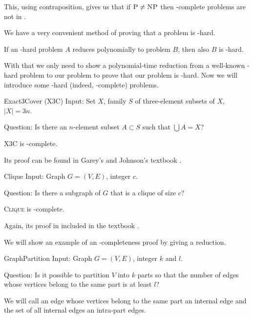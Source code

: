 This, using contraposition, gives us that if $\text{\textsc{P}} \neq \text{\textsc{NP}}$ then \np-complete problems are not in \p.

We have a very convenient method of proving that a problem is \np-hard.

\begin{rmrk}
If an \np-hard problem $A$ reduces polynomially to problem $B$, then also $B$ is \np-hard.
\end{rmrk}

With that we only need to show a polynomial-time reduction from a well-known \np-hard problem
to our problem to prove that our problem is \np-hard.
Now we will introduce some \np-hard (indeed, \np-complete) problems.

\begin{problem}{Exact3Cover (X3C)}
	Input: Set $X$, family $S$ of three-element subsets of $X$, $\vert{X}\vert = 3n$.

	Question: Is there an $n$-element subset $A \subset S$ such that $\bigcup A = X$?
\end{problem}

\begin{thm}
\textsc{X3C} is \np-complete.
\end{thm}

Its proof can be found in Garey's and Johnson's textbook \cite{computersandintractability}.

\begin{problem}{Clique}
    Input: Graph $G = (V, E)$, integer $c$.

    Question: Is there a subgraph of $G$ that is a clique of size $c$?
\end{problem}

\begin{thm}
\textsc{Clique} is \np-complete.
\end{thm}

Again, its proof in included in the textbook \cite{computersandintractability}.


We will show an example of an \np-completeness proof by giving a reduction.

\begin{problem}{GraphPartition}
Input: Graph $G = (V, E)$, integer $k$ and $l$.

Question: Is it possible to partition $V$ into $k$ parts so that the number of edges
whose vertices belong to the same part is at least $l$?
\end{problem}

We will call an edge whose vertices belong to the same part an internal edge
and the set of all internal edges an intra-part edges.

